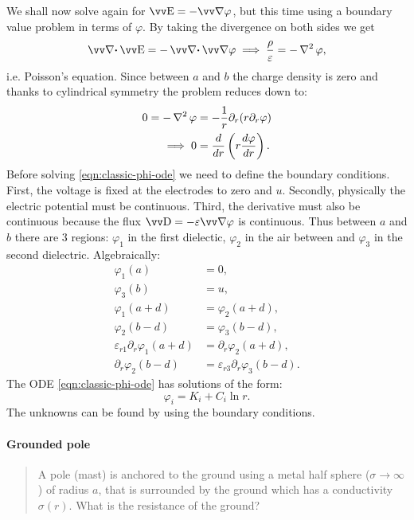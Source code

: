 \documentclass[margin=small]{tex/hsrzf}
\theoremstyle{elmagzf}
\begin{document}
We shall now solve again for \(\vec{E} = -\grad \varphi\), but this time using a
boundary value problem in terms of \(\varphi\). By taking the divergence on both
sides we get
\[
  \div \vec{E} = - \div \grad \varphi \implies
  \frac{\rho}{\varepsilon} = - \laplacian \varphi,
\]
i.e. Poisson's equation. Since between \(a\) and \(b\) the charge density is
zero and thanks to cylindrical symmetry the problem reduces down to:
\begin{align}
  0 = - \operatorname{\nabla^2} \varphi
    &= - \frac{1}{r} \partial_r ( r \partial_r \varphi ) \nonumber \\
  \implies 0 &= \frac{d}{dr} \left( r \frac{d\varphi}{dr} \right).
  \label{eqn:classic-phi-ode}
\end{align}
Before solving \eqref{eqn:classic-phi-ode} we need to define the boundary
conditions.  First, the voltage is fixed at the electrodes to zero and \(u\).
Secondly, physically the electric potential must be continuous. Third, the
derivative must also be continuous because the flux \(\vec{D} = - \varepsilon
\grad \varphi\) is continuous.  Thus between \(a\) and \(b\) there are 3
regions: \(\varphi_1\) in the first dielectic, \(\varphi_2\) in the air between
and \(\varphi_3\) in the second dielectric.  Algebraically:
\begin{subequations}
  \begin{align}
    \varphi_1(a) &= 0, \label{eqn:classic-phi-bound-1z} \\
    \varphi_3(b) &= u, \label{eqn:classic-phi-bound-3u} \\
    \varphi_1(a + d) &= \varphi_2(a + d), \\
    \varphi_2(b - d) &= \varphi_3(b - d), \\
    \varepsilon_{r1} \partial_r \varphi_1(a + d) &= \partial_r \varphi_2(a + d),
      \label{eqn:classic-phi-bound-d12} \\
    \partial_r \varphi_2(b - d) &= \varepsilon_{r3} \partial_r \varphi_3(b - d).
      \label{eqn:classic-phi-bound-d23}
  \end{align}
\end{subequations}
The ODE \eqref{eqn:classic-phi-ode} has solutions of the form:
\begin{equation}
  \varphi_i = K_i + C_i \ln r.
\end{equation}
The unknowns can be found by using the boundary conditions.

\paragraph{Grounded pole}
\begin{quote}
  A pole (mast) is anchored to the ground using a metal half sphere (\(\sigma
  \to \infty\)) of radius \(a\), that is surrounded by the ground which has a
  conductivity \(\sigma(r)\). What is the resistance of the ground?
\end{quote}
\end{document}

